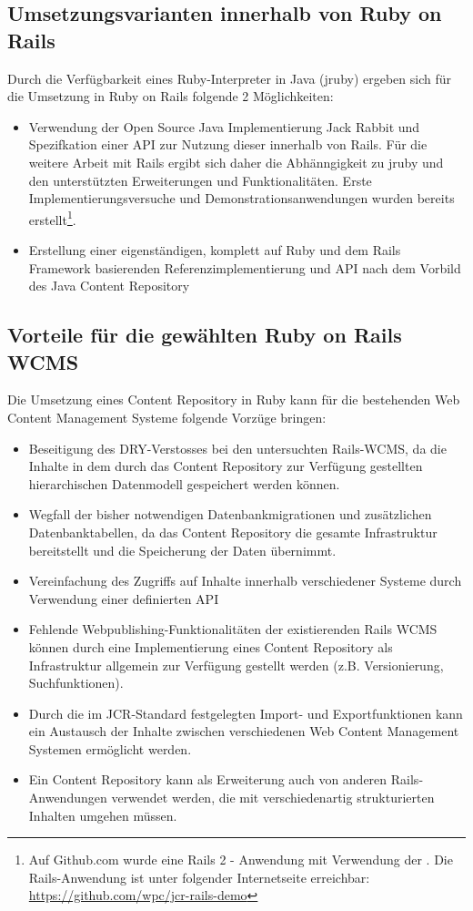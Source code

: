 \subsection{Umsetzungsvarianten innerhalb von Ruby on Rails}

Durch die Verfügbarkeit eines Ruby-Interpreter in Java (jruby) ergeben sich für die Umsetzung in Ruby on Rails folgende 2 Möglichkeiten:

\begin{itemize}
\item
Verwendung der Open Source Java Implementierung Jack Rabbit und Spezifkation einer API zur Nutzung dieser innerhalb von Rails. Für die weitere Arbeit mit Rails ergibt sich daher die Abhänngigkeit zu jruby und den unterstützten Erweiterungen und Funktionalitäten. Erste Implementierungsversuche und Demonstrationsanwendungen wurden bereits erstellt\footnote{Auf Github.com wurde eine Rails 2 - Anwendung mit Verwendung der . Die Rails-Anwendung ist unter folgender Internetseite erreichbar: \href{https://github.com/wpc/jcr-rails-demo}{https://github.com/wpc/jcr-rails-demo}}.
\item
Erstellung einer eigenständigen, komplett auf Ruby und dem Rails Framework basierenden Referenzimplementierung und API nach dem Vorbild des Java Content Repository
\end{itemize}


\subsection{Vorteile für die gewählten Ruby on Rails WCMS}

Die Umsetzung eines Content Repository in Ruby kann für die bestehenden Web Content Management Systeme folgende Vorzüge bringen:

\begin{itemize}
\item Beseitigung des DRY-Verstosses bei den untersuchten Rails-WCMS, da die Inhalte in dem durch das Content Repository zur Verfügung gestellten hierarchischen Datenmodell gespeichert werden können.
\item
Wegfall der bisher notwendigen Datenbankmigrationen und zusätzlichen Datenbanktabellen, da das Content Repository die gesamte Infrastruktur bereitstellt und die Speicherung der Daten übernimmt.
\item Vereinfachung des Zugriffs auf Inhalte innerhalb verschiedener Systeme durch Verwendung einer definierten API
\item Fehlende Webpublishing-Funktionalitäten der existierenden Rails WCMS können durch eine Implementierung eines Content Repository als Infrastruktur allgemein zur Verfügung gestellt werden (z.B. Versionierung, Suchfunktionen).
\item Durch die im JCR-Standard festgelegten Import- und Exportfunktionen kann ein Austausch der Inhalte zwischen verschiedenen Web Content Management Systemen ermöglicht werden.
\item Ein Content Repository kann als Erweiterung auch von anderen Rails-Anwendungen verwendet werden, die mit verschiedenartig strukturierten Inhalten umgehen müssen.
\end{itemize}



